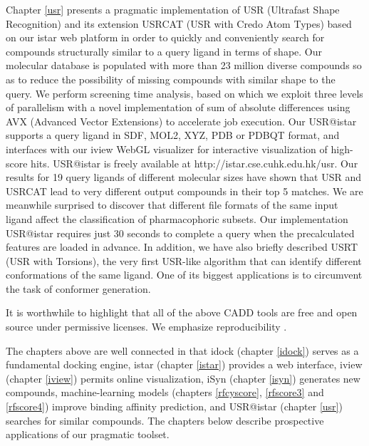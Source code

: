 Chapter \ref{usr} presents a pragmatic implementation of USR (Ultrafast Shape Recognition) \citep{1379} and its extension USRCAT (USR with Credo Atom Types) \citep{1331} based on our istar web platform in order to quickly and conveniently search for compounds structurally similar to a query ligand in terms of shape. Our molecular database is populated with more than 23 million diverse compounds so as to reduce the possibility of missing compounds with similar shape to the query. We perform screening time analysis, based on which we exploit three levels of parallelism with a novel implementation of sum of absolute differences using AVX (Advanced Vector Extensions) to accelerate job execution. Our USR@istar supports a query ligand in SDF, MOL2, XYZ, PDB or PDBQT format, and interfaces with our iview WebGL visualizer for interactive visualization of high-score hits. USR@istar is freely available at http://istar.cse.cuhk.edu.hk/usr. Our results for 19 query ligands of different molecular sizes have shown that USR and USRCAT lead to very different output compounds in their top 5 matches. We are meanwhile surprised to discover that different file formats of the same input ligand affect the classification of pharmacophoric subsets. Our implementation USR@istar requires just 30 seconds to complete a query when the precalculated features are loaded in advance. In addition, we have also briefly described USRT (USR with Torsions), the very first USR-like algorithm that can identify different conformations of the same ligand. One of its biggest applications is to circumvent the task of conformer generation.

It is worthwhile to highlight that all of the above CADD tools are free and open source under permissive licenses. We emphasize reproducibility \citep{965}.

The chapters above are well connected in that idock (chapter \ref{idock}) serves as a fundamental docking engine, istar (chapter \ref{istar}) provides a web interface, iview (chapter \ref{iview}) permits online visualization, iSyn (chapter \ref{isyn}) generates new compounds, machine-learning models (chapters \ref{rfcyscore}, \ref{rfscore3} and \ref{rfscore4}) improve binding affinity prediction, and USR@istar (chapter \ref{usr}) searches for similar compounds. The chapters below describe prospective applications of our pragmatic toolset.

